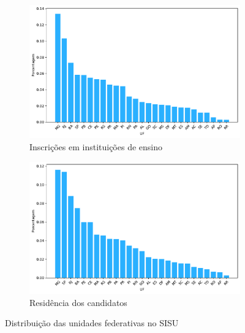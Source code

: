                     \begin{figure}[h]
                        \centering
                    
                        \begin{subfigure}{\textwidth}
                            \centering
                            \includegraphics[width=\linewidth]{figuras/distribuicao_ies.pdf}
                            \caption{Inscrições em instituições de ensino}
                        \end{subfigure}
                        \hfill
                        \begin{subfigure}{\textwidth}
                            \centering
                            \includegraphics[width=\linewidth]{figuras/distribuicao_residencia_candidatos.pdf}
                            \caption{Residência dos candidatos}
                        \end{subfigure}
                    
                        \caption{Distribuição das unidades federativas no SISU}
                        \label{fig:distribuicao-uf}
                    \end{figure}